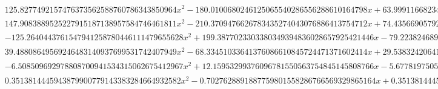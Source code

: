 \documentclass{article}
\begin{document}
\begin{landscape}
\begin{eqnarray*}
\begin{array}{cc}
\begin{array}{cc}
 125.8277492157476373562588760786343850964 x^2-180.0100680246125065540286556288610164798 x+63.99911668234123280353108015978872517275 & x\geq \frac{5}{8}\land x<\frac{11}{16} \\
 147.9083889525227915187138957584746461811 x^2-210.3709476626783435274043076886413754712 x+74.43566905792636426312896055533822357604 & x\geq \frac{11}{16}\land x<\frac{3}{4} \\
 -125.2640443761547941258780446111479655628 x^2+199.3877023303380349394836028657925421446 x-79.22382468945477766195400590257449552989 & x\geq \frac{3}{4}\land x<\frac{13}{16} \\
 39.48808649569246483140937699531742407949 x^2-68.33451033641376086610845724471371602414 x+29.53832420641313938406776851731867185115 & x\geq \frac{13}{16}\land x<\frac{7}{8} \\
 -6.508509692978808700941534315062675412967 x^2+12.15953299376096781550563754845145808766 x-5.677819750538304414138397954691091822760 & x\geq \frac{7}{8}\land x<\frac{15}{16} \\
 0.3513814445943879900779143383284664932582 x^2-0.7027628891887759801558286766569329865164 x+0.3513814445943879900779143383284664932582 & x\geq \frac{15}{16}\land x<1
\end{array}


\end{array}
\end{eqnarray*}
\end{landscape}
\end{document}
